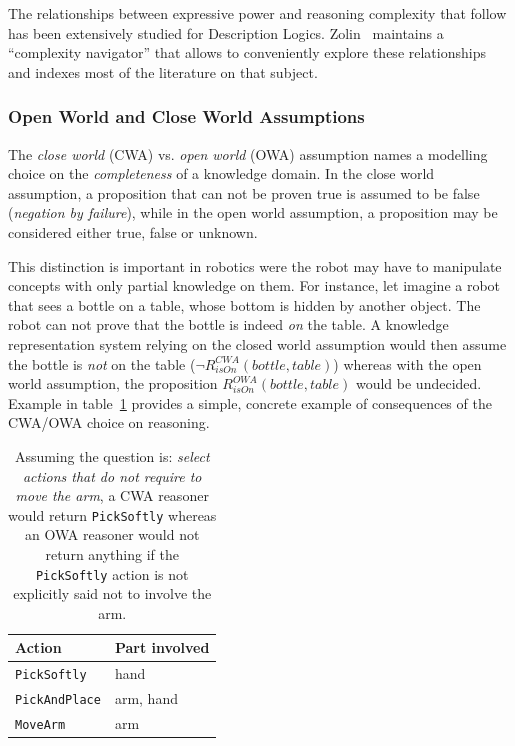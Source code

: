 \documentclass[a4paper, twocolumn]{article}
\begin{document}
The relationships between expressive power and reasoning complexity that follow
has been extensively studied for Description Logics.
Zolin~\cite{ZolinDLComplexityNavigator} maintains a ``complexity navigator''
that allows to conveniently explore these relationships and indexes most of the
literature on that subject.

\subsubsection{Open World and Close World Assumptions}

The \emph{close world} (CWA) vs. \emph{open world} (OWA) assumption names a
modelling choice on the \emph{completeness} of a knowledge domain. In the close
world assumption, a proposition that can not be proven true is assumed to be
false (\emph{negation by failure}), while in the open world assumption, a
proposition may be considered either true, false or unknown.

This distinction is important in robotics were the robot may have to manipulate
concepts with only partial knowledge on them. For instance, let imagine a robot
that sees a bottle on a table, whose bottom is hidden by another object. The
robot can not prove that the bottle is indeed \emph{on} the table. A knowledge
representation system relying on the closed world assumption would then assume
the bottle is \emph{not} on the table ($\lnot R^{CWA}_{isOn}(bottle, table)$)
whereas with the open world assumption, the proposition $R^{OWA}_{isOn}(bottle,
table)$ would be undecided. Example in table~\ref{table|cwa-owa-example} provides
a simple, concrete example of consequences of the CWA/OWA choice on reasoning.

\begin{table}
	\begin{center}
	\begin{tabular}{ll}
	{\bf Action} & {\bf Part involved} \\
	\hline
	{\tt PickSoftly} & hand \\
	{\tt PickAndPlace} & arm, hand \\
	{\tt MoveArm} & arm \\
	\hline
	\end{tabular}
	\end{center}
	\caption{Assuming the question is: \emph{select actions that do not require
	to move the arm}, a CWA reasoner would return {\tt PickSoftly} whereas an
	OWA reasoner would not return anything if the {\tt PickSoftly} action is
	not explicitly said not to involve the arm.}
	\label{table|cwa-owa-example}
\end{table}
\end{document}
